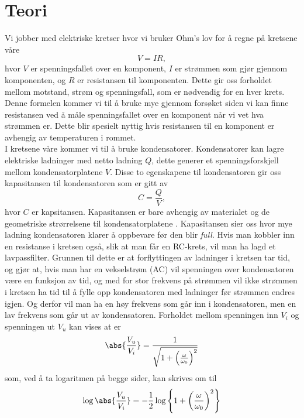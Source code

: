 \documentclass[%
 reprint,
 amsmath,amssymb,
 aps,
]{revtex4-1}
\begin{document}
\section{\label{teori}Teori}
Vi jobber med elektriske kretser hvor vi bruker Ohm's lov \cite{skaar} for å regne på kretsene våre
\begin{equation}
  V = IR \label{ohm},
\end{equation}
hvor $V$ er spenningsfallet over en komponent, $I$ er strømmen som gjør gjennom komponenten, og $R$ er resistansen til komponenten. Dette gir oss forholdet mellom motstand, strøm og spenningsfall, som er nødvendig for en hver krets. Denne formelen kommer vi til å bruke mye gjennom forsøket siden vi kan finne resistansen ved å måle spenningsfallet over en komponent når vi vet hva strømmen er. Dette blir spesielt nyttig hvis resistansen til en komponent er avhengig av temperaturen i rommet. \\
I kretsene våre kommer vi til å bruke kondensatorer. Kondensatorer kan lagre elektriske ladninger med netto ladning $Q$, dette generer et spenningsforskjell mellom kondensatorplatene $V$. Disse to egenskapene til kondensatoren gir oss kapasitansen til kondensatoren som er gitt av
\begin{equation}
  C = \frac{Q}{V},
\end{equation}
hvor $C$ er kapsitansen. Kapasitansen er bare avhengig av materialet og de geometriske strørrelsene til kondensatorplatene \cite{skaar}. Kapasitansen sier oss hvor mye ladning kondensatoren klarer å oppbevare før den blir \textit{full}. Hvis man kobbler inn en resistanse i kretsen også, slik at man får en RC-krets, vil man ha lagd et lavpassfilter. Grunnen til dette er at forflyttingen av ladninger i kretsen tar tid, og gjør at, hvis man har en vekselstrøm (AC) vil spenningen over kondensatoren være en funksjon av tid, og med for stor frekvens på strømmen vil ikke strømmen i kretsen ha tid til å fylle opp kondensatoren med ladninger før strømmen endres igjen. Og derfor vil man ha en høy frekvens som går inn i kondensatoren, men en lav frekvens som går ut av kondensatoren. Forholdet mellom spenningen inn $V_i$ og spenningen ut $V_u$ kan vises at \cite{oppgave} er
\begin{equation}
  \abs{\frac{V_u}{V_i}} = \frac{1}{\sqrt{1+\left(\frac{\omega}{\omega_0}\right)^2}}
\end{equation}som, ved å ta logaritmen på begge sider, kan skrives om til
\begin{equation}
  \log\abs{\frac{V_u}{V_i}} = -\frac{1}{2}\log\left\{1+\left(\frac{\omega}{\omega_0}\right)^2 \right\}
\end{equation}
\end{document}
